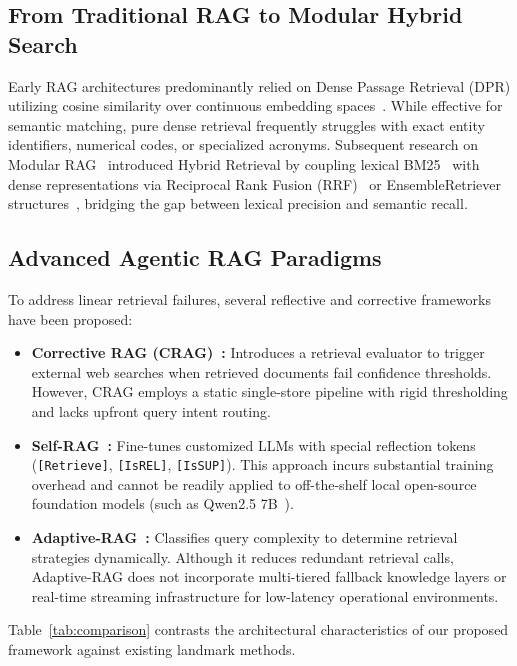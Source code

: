 \documentclass[conference]{IEEEtran}
\begin{document}
\subsection{From Traditional RAG to Modular Hybrid Search}
Early RAG architectures predominantly relied on Dense Passage Retrieval (DPR) utilizing cosine similarity over continuous embedding spaces~\cite{lewis2020retrieval, karpukhin2020dense, chroma2023, reimers2019sentence}. While effective for semantic matching, pure dense retrieval frequently struggles with exact entity identifiers, numerical codes, or specialized acronyms. Subsequent research on Modular RAG~\cite{gao2023modular} introduced Hybrid Retrieval by coupling lexical BM25~\cite{robertson2009probabilistic} with dense representations via Reciprocal Rank Fusion (RRF)~\cite{cormack2009reciprocal} or EnsembleRetriever structures~\cite{ensemble2023}, bridging the gap between lexical precision and semantic recall.

\subsection{Advanced Agentic RAG Paradigms}
To address linear retrieval failures, several reflective and corrective frameworks have been proposed:
\begin{itemize}
    \item \textbf{Corrective RAG (CRAG)~\cite{yan2024corrective}:} Introduces a retrieval evaluator to trigger external web searches when retrieved documents fail confidence thresholds. However, CRAG employs a static single-store pipeline with rigid thresholding and lacks upfront query intent routing.
    \item \textbf{Self-RAG~\cite{asai2023self}:} Fine-tunes customized LLMs with special reflection tokens (\texttt{[Retrieve]}, \texttt{[IsREL]}, \texttt{[IsSUP]}). This approach incurs substantial training overhead and cannot be readily applied to off-the-shelf local open-source foundation models (such as Qwen2.5 7B~\cite{qwen2024}).
    \item \textbf{Adaptive-RAG~\cite{jeong2024adaptive}:} Classifies query complexity to determine retrieval strategies dynamically. Although it reduces redundant retrieval calls, Adaptive-RAG does not incorporate multi-tiered fallback knowledge layers or real-time streaming infrastructure for low-latency operational environments.
\end{itemize}

Table~\ref{tab:comparison} contrasts the architectural characteristics of our proposed framework against existing landmark methods.
\end{document}
